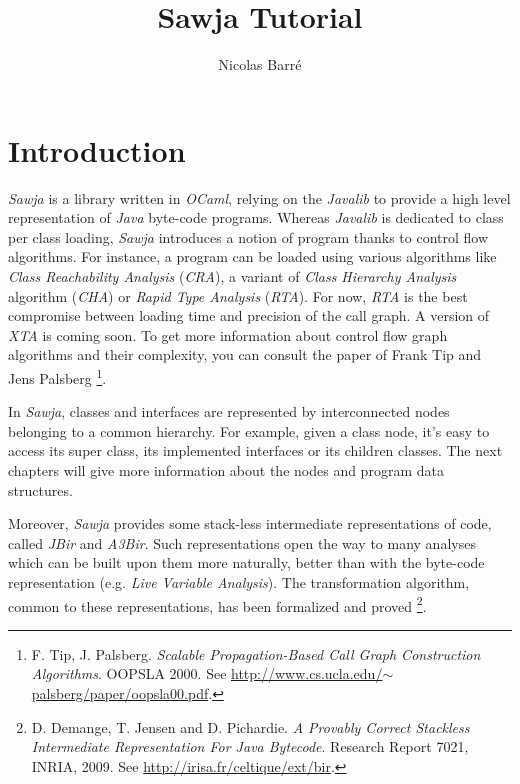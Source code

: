 \documentclass{article}
\title{Sawja Tutorial}
\author{Nicolas Barré}
\begin{document}
\maketitle
\newpage

\tableofcontents
\newpage
\section{Introduction}

\emph{Sawja} is a library written in \emph{OCaml}, relying on the
\emph{Javalib} to provide a high level representation of
\emph{Java} byte-code programs. Whereas \emph{Javalib} is dedicated
to class per class loading, \emph{Sawja} introduces a notion of
program thanks to control flow algorithms. For instance, a program
can be loaded using various algorithms like
\emph{Class Reachability Analysis} (\emph{CRA}), a variant of
\emph{Class Hierarchy Analysis} algorithm (\emph{CHA}) or
\emph{Rapid Type Analysis} (\emph{RTA}). For now, \emph{RTA} is the
best compromise between loading time and precision of the call
graph. A version of \emph{XTA} is coming soon. To get more
information about control flow graph algorithms and their
complexity, you can consult the paper of Frank Tip and Jens
Palsberg%
\footnote{F. Tip, J. Palsberg.
\emph{Scalable Propagation-Based Call Graph Construction Algorithms}.
OOPSLA 2000. See
\href{http://www.cs.ucla.edu/~palsberg/paper/oopsla00.pdf}{http://www.cs.ucla.edu/\ensuremath{\sim}palsberg/paper/oopsla00.pdf}.}.

In \emph{Sawja}, classes and interfaces are represented by
interconnected nodes belonging to a common hierarchy. For example,
given a class node, it's easy to access its super class, its
implemented interfaces or its children classes. The next chapters
will give more information about the nodes and program data
structures.

Moreover, \emph{Sawja} provides some stack-less intermediate
representations of code, called \emph{JBir} and \emph{A3Bir}. Such
representations open the way to many analyses which can be built
upon them more naturally, better than with the byte-code
representation (e.g. \emph{Live Variable Analysis}). The
transformation algorithm, common to these representations, has been
formalized and proved%
\footnote{D. Demange, T. Jensen and D. Pichardie.
\emph{A Provably Correct Stackless Intermediate Representation For Java Bytecode}.
Research Report 7021, INRIA, 2009. See
\href{http://irisa.fr/celtique/ext/bir}{http://irisa.fr/celtique/ext/bir}.}.
\end{document}
